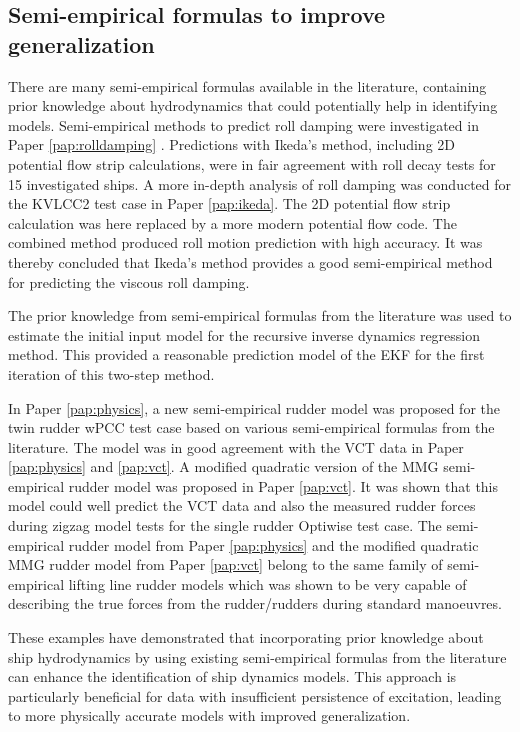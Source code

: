 \subsection*{Semi-empirical formulas to improve generalization}
There are many semi-empirical formulas available in the literature, containing prior knowledge about hydrodynamics that could potentially help in identifying models.       
Semi-empirical methods to predict roll damping were investigated in Paper \ref{pap:rolldamping} . Predictions with Ikeda's method, including 2D potential flow strip calculations, were in fair agreement with roll decay tests for 15 investigated ships. 
A more in-depth analysis of roll damping was conducted for the KVLCC2 test case in Paper \ref{pap:ikeda}. The 2D potential flow strip calculation was here replaced by a more modern potential flow code. The combined method produced roll motion prediction with high accuracy. It was thereby concluded that Ikeda's method provides a good semi-empirical method for predicting the viscous roll damping.

The prior knowledge from semi-empirical formulas from the literature was used to estimate the initial input model for the recursive inverse dynamics regression method. This provided a reasonable prediction model of the EKF for the first iteration of this two-step method.

In Paper \ref{pap:physics}, a new semi-empirical rudder model was proposed for the twin rudder wPCC test case based on various semi-empirical formulas from the literature. The model was in good agreement with the VCT data in Paper \ref{pap:physics} and \ref{pap:vct}. 
A modified quadratic version of the MMG semi-empirical rudder model was proposed in Paper \ref{pap:vct}. 
It was shown that this model could well predict the VCT data and also the measured rudder forces during zigzag model tests for the single rudder Optiwise test case. 
The semi-empirical rudder model from Paper \ref{pap:physics} and the modified quadratic MMG rudder model from Paper \ref{pap:vct} belong to the same family of semi-empirical lifting line rudder models which was shown to be very capable of describing the true forces from the rudder/rudders during standard manoeuvres. 

These examples have demonstrated that incorporating prior knowledge about ship hydrodynamics by using existing semi-empirical formulas from the literature can enhance the identification of ship dynamics models. This approach is particularly beneficial for data with insufficient persistence of excitation, leading to more physically accurate models with improved generalization. 